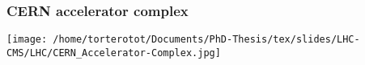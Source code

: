 \begin{frame}
\frametitle{CERN accelerator complex}
\begin{center}
\texttt{[image: /home/torterotot/Documents/PhD-Thesis/tex/slides/LHC-CMS/LHC/CERN\_Accelerator-Complex.jpg]}
\end{center}
\end{frame}
